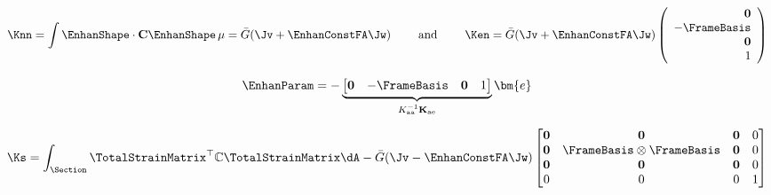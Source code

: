 \begin{equation}
\Knn = \int \EnhanShape \cdot \mathbf{C}\EnhanShape \, \mu = \bar{G} (\Jv+\EnhanConstFA \Jw)
\qquad\text{ and }\qquad
\Ken = \bar{G} (\Jv+\EnhanConstFA \Jw) \left(\begin{array}{r}
    ~\mathbf{0} \\ 
    - \FrameBasis \\
    ~\mathbf{0} \\
    ~1
\end{array}\right)
\end{equation}

\begin{equation}
    \EnhanParam = - \underbrace{\begin{bmatrix}
        \mathbf{0} & -\FrameBasis & \mathbf{0} & 1
    \end{bmatrix}}_{K_{\mathrm{aa}}^{-1}\mathbf{K}_{\mathrm{ae}}}\bm{e}
\end{equation}

\begin{equation}
\Ks = \int_{\Section} \TotalStrainMatrix^{\top}\mathbb{C}\TotalStrainMatrix \dA 
- \bar{G}(\Jv - \EnhanConstFA \Jw) \begin{bmatrix}
\mathbf{0} & \mathbf{0} & \mathbf{0} & 0 \\
\mathbf{0} & \FrameBasis\otimes\FrameBasis & \mathbf{0} & 0 \\
\mathbf{0} & \mathbf{0} & \mathbf{0} & 0 \\
    0  &     0  &     0  & 1 \\
\end{bmatrix}
\end{equation}

% 

%
\fi